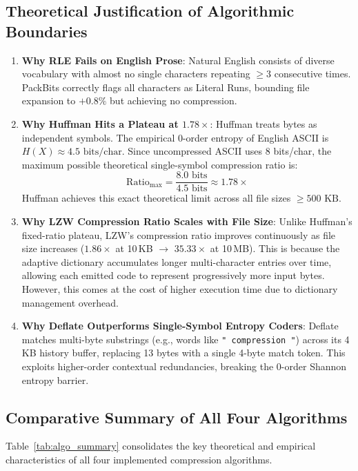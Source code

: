 \documentclass[12pt,a4paper]{article}
\begin{document}
\subsection{Theoretical Justification of Algorithmic Boundaries}
\begin{enumerate}
    \item \textbf{Why RLE Fails on English Prose}: Natural English consists of diverse vocabulary with almost no single characters repeating $\ge 3$ consecutive times. PackBits correctly flags all characters as Literal Runs, bounding file expansion to $+0.8\%$ but achieving no compression.
    \item \textbf{Why Huffman Hits a Plateau at $1.78\times$}: Huffman treats bytes as independent symbols. The empirical 0-order entropy of English ASCII is $H(X) \approx 4.5\text{ bits/char}$. Since uncompressed ASCII uses 8 bits/char, the maximum possible theoretical single-symbol compression ratio is:
    \begin{equation}
    \text{Ratio}_{\max} = \frac{8.0\text{ bits}}{4.5\text{ bits}} \approx \mathbf{1.78\times}
    \end{equation}
    Huffman achieves this exact theoretical limit across all file sizes $\ge 500\text{ KB}$.
    \item \textbf{Why LZW Compression Ratio Scales with File Size}: Unlike Huffman's fixed-ratio plateau, LZW's compression ratio improves continuously as file size increases ($1.86\times$ at 10\,KB $\to$ $35.33\times$ at 10\,MB). This is because the adaptive dictionary accumulates longer multi-character entries over time, allowing each emitted code to represent progressively more input bytes. However, this comes at the cost of higher execution time due to dictionary management overhead.
    \item \textbf{Why Deflate Outperforms Single-Symbol Entropy Coders}: Deflate matches multi-byte substrings (e.g., words like \texttt{" compression "}) across its 4\,KB history buffer, replacing 13 bytes with a single 4-byte match token. This exploits higher-order contextual redundancies, breaking the 0-order Shannon entropy barrier.
\end{enumerate}

\subsection{Comparative Summary of All Four Algorithms}
Table~\ref{tab:algo_summary} consolidates the key theoretical and empirical characteristics of all four implemented compression algorithms.
\end{document}
